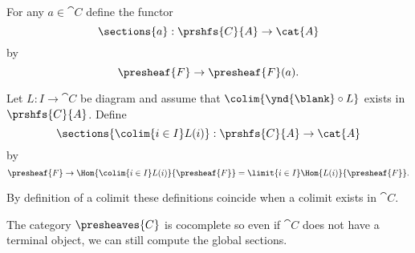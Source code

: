 \begin{definition}
For any $a\in \cat{C}$ define the functor 
\[\sections{a}: \prshfs{C}{A} \rightarrow \cat{A}\]
by
\[\presheaf{F} \rightarrow \presheaf{F}(a).\]

Let $L: I \rightarrow \cat{C}$ be diagram 
and assume that $\colim{\ynd{\blank}\circ L}$ exists in $\prshfs{C}{A}$.
Define 
\[\sections{\colim{i\in I} L(i)}: \prshfs{C}{A} \rightarrow \cat{A}\] %
by
\[\presheaf{F} \rightarrow \Hom{\colim{i\in I} L(i)}{\presheaf{F}} = \limit{i\in I} \Hom{L(i)} {\presheaf{F}}.\]

By definition of a colimit these definitions coincide when a colimit exists in $\cat{C}$.
\end{definition}

\begin{remark}
The category $\presheaves{C}$ is cocomplete 
so even if $\cat{C}$ does not have a terminal object, 
we can still compute the global sections.
\end{remark}